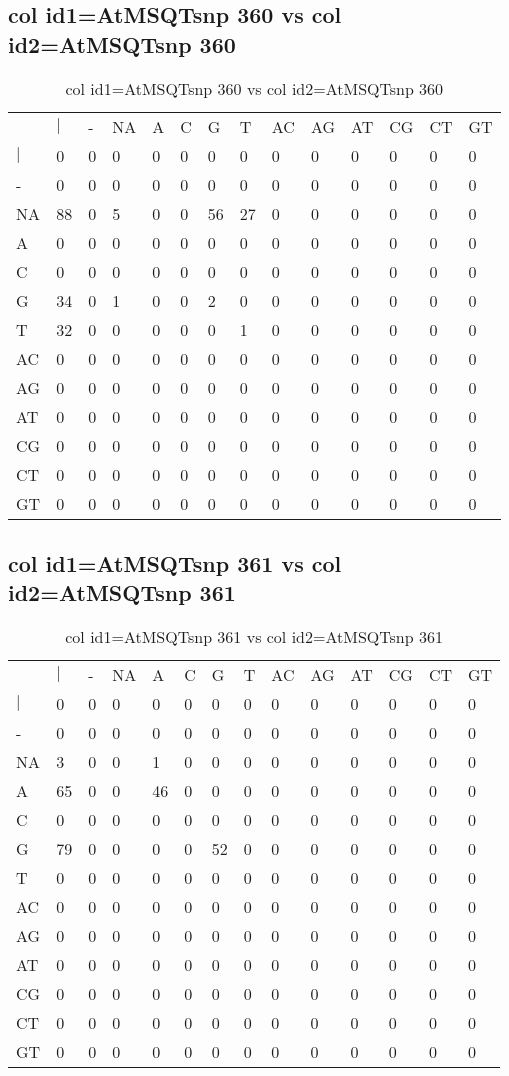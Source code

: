 \subsection{col id1=AtMSQTsnp 360 vs col id2=AtMSQTsnp 360}
\begin{center}
\begin{longtable}{|l|l|l|l|l|l|l|l|l|l|l|l|l|l|}
\caption{col id1=AtMSQTsnp 360 vs col id2=AtMSQTsnp 360} \label{table_dm688}\\
\hline
\\
\hline
&$|$&-&NA&A&C&G&T&AC&AG&AT&CG&CT&GT\\
$|$&0&0&0&0&0&0&0&0&0&0&0&0&0\\
-&0&0&0&0&0&0&0&0&0&0&0&0&0\\
NA&88&0&5&0&0&56&27&0&0&0&0&0&0\\
A&0&0&0&0&0&0&0&0&0&0&0&0&0\\
C&0&0&0&0&0&0&0&0&0&0&0&0&0\\
G&34&0&1&0&0&2&0&0&0&0&0&0&0\\
T&32&0&0&0&0&0&1&0&0&0&0&0&0\\
AC&0&0&0&0&0&0&0&0&0&0&0&0&0\\
AG&0&0&0&0&0&0&0&0&0&0&0&0&0\\
AT&0&0&0&0&0&0&0&0&0&0&0&0&0\\
CG&0&0&0&0&0&0&0&0&0&0&0&0&0\\
CT&0&0&0&0&0&0&0&0&0&0&0&0&0\\
GT&0&0&0&0&0&0&0&0&0&0&0&0&0\\
\hline
\end{longtable}
\end{center}

\subsection{col id1=AtMSQTsnp 361 vs col id2=AtMSQTsnp 361}
\begin{center}
\begin{longtable}{|l|l|l|l|l|l|l|l|l|l|l|l|l|l|}
\caption{col id1=AtMSQTsnp 361 vs col id2=AtMSQTsnp 361} \label{table_dm690}\\
\hline
\\
\hline
&$|$&-&NA&A&C&G&T&AC&AG&AT&CG&CT&GT\\
$|$&0&0&0&0&0&0&0&0&0&0&0&0&0\\
-&0&0&0&0&0&0&0&0&0&0&0&0&0\\
NA&3&0&0&1&0&0&0&0&0&0&0&0&0\\
A&65&0&0&46&0&0&0&0&0&0&0&0&0\\
C&0&0&0&0&0&0&0&0&0&0&0&0&0\\
G&79&0&0&0&0&52&0&0&0&0&0&0&0\\
T&0&0&0&0&0&0&0&0&0&0&0&0&0\\
AC&0&0&0&0&0&0&0&0&0&0&0&0&0\\
AG&0&0&0&0&0&0&0&0&0&0&0&0&0\\
AT&0&0&0&0&0&0&0&0&0&0&0&0&0\\
CG&0&0&0&0&0&0&0&0&0&0&0&0&0\\
CT&0&0&0&0&0&0&0&0&0&0&0&0&0\\
GT&0&0&0&0&0&0&0&0&0&0&0&0&0\\
\hline
\end{longtable}
\end{center}

